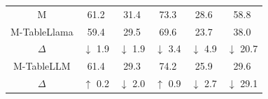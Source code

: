 \documentclass[11pt]{article}
\begin{document}
\begin{table}[t]
{\begin{tabular}{cccccc}
M    & 61.2 & 31.4 & 73.3 & 28.6 & 58.8 \\
M-TableLlama & 59.4 & 29.5 & 69.6 & 23.7 & 38.0 \\
$\Delta$ & \hspace{-0.2em}$\downarrow$ 1.9 & \hspace{-0.2em}$\downarrow$ 1.9 & \hspace{-0.2em}$\downarrow$ 3.4 & \hspace{-0.2em}$\downarrow$ 4.9 & \hspace{-0.3em}$\downarrow$ 20.7 \\
\midrule
M-TableLLM & 61.4 & 29.3 & 74.2 & 25.9 & 29.6 \\
$\Delta$ & \hspace{-0.2em}$\uparrow$ 0.2 & \hspace{-0.2em}$\downarrow$ 2.0 & \hspace{-0.2em}$\uparrow$ 0.9 & \hspace{-0.2em}$\downarrow$ 2.7 & \hspace{-0.3em}$\downarrow$ 29.1 \\

\end{tabular}}
\end{table}
\end{document}
